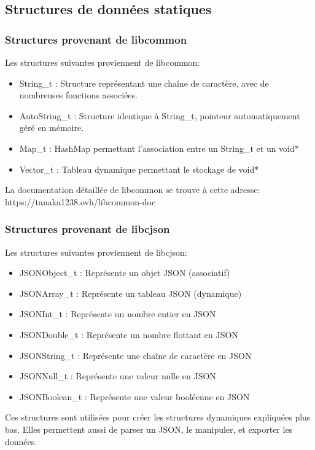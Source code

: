 % 
\subsection{Structures de données statiques}
\subsubsection{Structures provenant de libcommon}
Les structures suivantes proviennent de libcommon:
\begin{itemize}
	\item String\_t : Structure représentant une chaîne de caractère, avec de nombreuses fonctions associées.
	\item AutoString\_t : Structure identique à String\_t, pointeur automatiquement géré en mémoire.
	\item Map\_t : HashMap permettant l'association entre un String\_t et un void*
	\item Vector\_t : Tableau dynamique permettant le stockage de void*
\end{itemize}
La documentation détaillée de libcommon se trouve à cette adresse:\newline
https://tanaka1238.ovh/libcommon-doc
\par
\subsubsection{Structures provenant de libcjson}
Les structures suivantes proviennent de libcjson:
\begin{itemize}
	\item JSONObject\_t : Représente un objet JSON (associatif)
	\item JSONArray\_t : Représente un tableau JSON (dynamique)
	\item JSONInt\_t : Représente un nombre entier en JSON
	\item JSONDouble\_t : Représente un nombre flottant en JSON
	\item JSONString\_t : Représente une chaîne de caractère en JSON
	\item JSONNull\_t : Représente une valeur nulle en JSON
	\item JSONBoolean\_t : Représente une valeur booléenne en JSON
\end{itemize}
Ces structures sont utilisées pour créer les structures dynamiques expliquées plus bas.
Elles permettent aussi de parser un JSON, le manipuler, et exporter les données.\par

